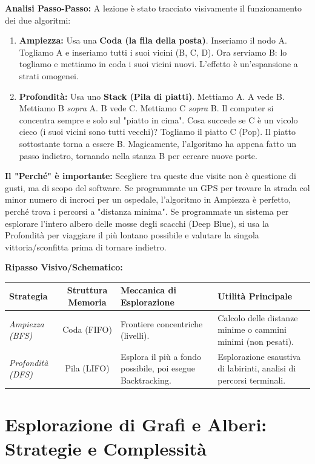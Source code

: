 \documentclass[a4paper, 11pt]{report}
\begin{document}
\textbf{Analisi Passo-Passo:}
A lezione è stato tracciato visivamente il funzionamento dei due algoritmi:
\begin{enumerate}
\item \textbf{Ampiezza:} Usa una \textbf{Coda (la fila della posta)}. Inseriamo il nodo A. Togliamo A e inseriamo tutti i suoi vicini (B, C, D). Ora serviamo B: lo togliamo e mettiamo in coda i suoi vicini nuovi. L'effetto è un'espansione a strati omogenei.
\item \textbf{Profondità:} Usa uno \textbf{Stack (Pila di piatti)}. Mettiamo A. A vede B. Mettiamo B \textit{sopra} A. B vede C. Mettiamo C \textit{sopra} B. Il computer si concentra sempre e solo sul "piatto in cima". Cosa succede se C è un vicolo cieco (i suoi vicini sono tutti vecchi)? Togliamo il piatto C (Pop). Il piatto sottostante torna a essere B. Magicamente, l'algoritmo ha appena fatto un passo indietro, tornando nella stanza B per cercare nuove porte.
\end{enumerate}

\textbf{Il "Perché" è importante:}
Scegliere tra queste due visite non è questione di gusti, ma di scopo del software. Se programmate un GPS per trovare la strada col minor numero di incroci per un ospedale, l'algoritmo in Ampiezza è perfetto, perché trova i percorsi a "distanza minima". Se programmate un sistema per esplorare l'intero albero delle mosse degli scacchi (Deep Blue), si usa la Profondità per viaggiare il più lontano possibile e valutare la singola vittoria/sconfitta prima di tornare indietro.

\textbf{Ripasso Visivo/Schematico:}
\begin{center}
\begin{tabular}{|l|c|p{5cm}|p{4.5cm}|}
\hline
\textbf{Strategia} & \textbf{Struttura Memoria} & \textbf{Meccanica di Esplorazione} & \textbf{Utilità Principale} \\
\hline
\textit{Ampiezza (BFS)} & Coda (FIFO) & Frontiere concentriche (livelli). & Calcolo delle distanze minime o cammini minimi (non pesati). \\
\hline
\textit{Profondità (DFS)} & Pila (LIFO) & Esplora il più a fondo possibile, poi esegue Backtracking. & Esplorazione esaustiva di labirinti, analisi di percorsi terminali. \\
\hline
\end{tabular}
\end{center}
\chapter{Esplorazione di Grafi e Alberi: Strategie e Complessità}
\end{document}
